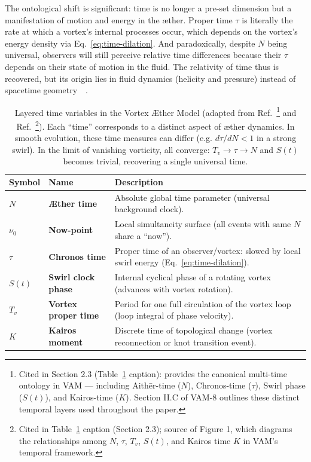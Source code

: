 \documentclass[a4paper,12pt]{article}
\begin{document}
    The ontological shift is significant: time is no longer a pre-set dimension but a manifestation of motion and energy in the æther. Proper time $\tau$ is literally the rate at which a vortex’s internal processes occur, which depends on the vortex’s energy density via Eq.~\eqref{eq:time-dilation}. And paradoxically, despite $N$ being universal, observers will still perceive relative time differences because their $\tau$ depends on their state of motion in the fluid. The relativity of time thus is recovered, but its origin lies in fluid dynamics (helicity and pressure) instead of spacetime geometry~\cite{reference_55}~\cite{reference_56}.

    \begin{table}[t]\centering
    \begin{tabular}{llp{8cm}}
        \hline
        Symbol & Name & Description \\
        \hline
        $N$ & \textbf{Æther time} & Absolute global time parameter (universal background clock). \\[6pt]
        $\nu_0$ & \textbf{Now-point} & Local simultaneity surface (all events with same $N$ share a ``now''). \\[6pt]
        $\tau$ & \textbf{Chronos time} & Proper time of an observer/vortex: slowed by local swirl energy (Eq.~\ref{eq:time-dilation}). \\[6pt]
        $S(t)$ & \textbf{Swirl clock phase} & Internal cyclical phase of a rotating vortex (advances with vortex rotation). \\[6pt]
        $T_v$ & \textbf{Vortex proper time} & Period for one full circulation of the vortex loop (loop integral of phase velocity). \\[6pt]
        $K$ & \textbf{Kairos moment} & Discrete time of topological change (vortex reconnection or knot transition event). \\
        \hline
    \end{tabular}
    \caption{Layered time variables in the Vortex Æther Model (adapted from Ref.~\cite{VAM8}\footnote{Cited in Section 2.3 (Table~\ref{tab:times} caption): provides the canonical multi-time ontology in VAM — including Aithēr-time ($N$), Chronos-time ($\tau$), Swirl phase ($S(t)$), and Kairos-time ($K$). Section II.C of VAM-8 outlines these distinct temporal layers used throughout the paper.} and Ref.~\cite{Iskandarani2025-lagrange}\footnote{Cited in Table~\ref{tab:times} caption (Section 2.3); source of Figure 1, which diagrams the relationships among $N$, $\tau$, $T_v$, $S(t)$, and Kairos time $K$ in VAM's temporal framework.}). Each ``time'' corresponds to a distinct aspect of æther dynamics. In smooth evolution, these time measures can differ (e.g. $d\tau/dN < 1$ in a strong swirl). In the limit of vanishing vorticity, all converge: $T_v \to \tau \to N$ and $S(t)$ becomes trivial, recovering a single universal time.}
    \label{tab:times}
    \end{table}
\end{document}
